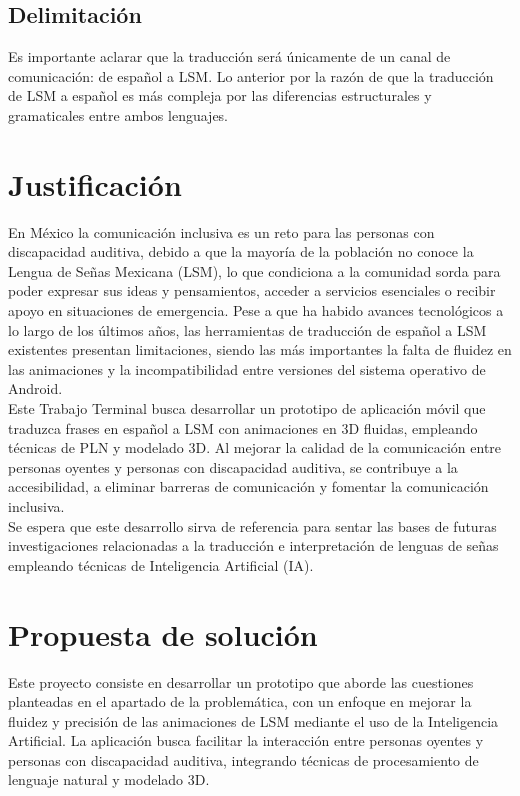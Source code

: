 \subsection{Delimitación}
Es importante aclarar que la traducción será únicamente de un canal de comunicación: de español a LSM. Lo anterior por la razón de que la traducción de LSM a español es más compleja por las diferencias estructurales y gramaticales entre ambos lenguajes.\\

\section{Justificación}
En México la comunicación inclusiva es un reto para las personas con discapacidad auditiva, debido a que la mayoría de la población no conoce la Lengua de Señas Mexicana (LSM), lo que condiciona a la comunidad sorda para poder expresar sus ideas y pensamientos, acceder a servicios esenciales o recibir apoyo en situaciones de emergencia. Pese a que ha habido avances tecnológicos a lo largo de los últimos años, las herramientas de traducción de español a LSM existentes presentan limitaciones, siendo las más importantes la falta de fluidez en las animaciones y la incompatibilidad entre versiones del sistema operativo de Android. \\

Este Trabajo Terminal busca desarrollar un prototipo de aplicación móvil que traduzca frases en español a LSM con animaciones en 3D fluidas, empleando técnicas de PLN y modelado 3D. Al mejorar la calidad de la comunicación entre personas oyentes y personas con discapacidad auditiva, se contribuye a la accesibilidad, a eliminar barreras de comunicación y fomentar la comunicación inclusiva.\\

Se espera que este desarrollo sirva de referencia para sentar las bases de futuras investigaciones relacionadas a la traducción e interpretación de lenguas de señas empleando técnicas de Inteligencia Artificial (IA).\\

\section{Propuesta de solución}
Este proyecto consiste en desarrollar un prototipo que aborde las cuestiones planteadas en el apartado de la problemática, con un enfoque en mejorar la fluidez y precisión de las animaciones de LSM mediante el uso de la Inteligencia Artificial. La aplicación busca facilitar la interacción entre personas oyentes y personas con discapacidad auditiva, integrando técnicas de procesamiento de lenguaje natural y modelado 3D.\\

